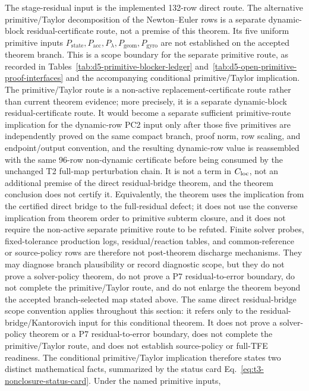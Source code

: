 \documentclass[preprint,12pt]{elsarticle}
\newcommand{\tfe}{TFE}
\begin{document}
The stage-residual input is the implemented 132-row direct route. The
alternative primitive/Taylor decomposition of the Newton--Euler rows is a
separate dynamic-block residual-certificate route, not a premise of this
theorem. Its five uniform primitive inputs
\(P_{\mathrm{state}},P_{\mathrm{acc}},P_{\lambda},
P_{\mathrm{geom}},P_{\mathrm{gyro}}\) are not established on the accepted
theorem branch.  This is a scope boundary for the separate primitive route, as recorded in
Tables~\ref{tab:d5-primitive-blocker-ledger}
and~\ref{tab:d5-open-primitive-proof-interfaces} and the accompanying
conditional primitive/Taylor implication. The primitive/Taylor route is a
non-active replacement-certificate route rather than current theorem evidence;
more precisely, it is a separate dynamic-block residual-certificate route. It would become
a separate sufficient primitive-route implication for the dynamic-row PC2
input only after those five primitives are independently proved on the same
compact branch, proof norm, row scaling, and endpoint/output convention, and
the resulting dynamic-row value is reassembled with the same 96-row
non-dynamic certificate before being consumed by the unchanged T2 full-map
perturbation chain. It is not
a term in \(C_{\rm loc}\), not an additional
premise of the direct residual-bridge theorem, and the theorem conclusion
does not certify it. Equivalently, the theorem uses the implication from the certified
direct bridge to the full-residual defect; it does not use the converse
implication from theorem order to primitive subterm closure, and it does not
require the non-active separate primitive route to be refuted. Finite solver
probes, fixed-tolerance production logs, residual/reaction tables, and
common-reference or source-policy rows are therefore not post-theorem
discharge mechanisms. They may diagnose branch plausibility or record
diagnostic scope, but they do not prove a solver-policy theorem, do not prove
a P7 residual-to-error boundary, do not complete
the primitive/Taylor route, and do not enlarge the theorem beyond the accepted
branch-selected map stated above.  The same direct residual-bridge scope convention
applies throughout this section: it refers only to the
residual-bridge/Kantorovich input for this conditional theorem. It does not
prove a solver-policy theorem or a P7 residual-to-error boundary, does not
complete the primitive/Taylor route, and does not establish source-policy or
full-\tfe{} readiness.
The conditional primitive/Taylor implication therefore states two distinct mathematical
facts, summarized by the status card
Eq.~\eqref{eq:t3-nonclosure-status-card}.  Under the named primitive inputs,
\end{document}
